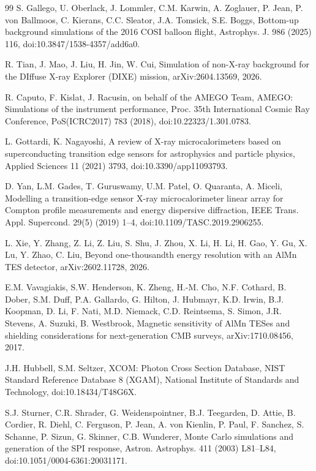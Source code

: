 \documentclass[11pt]{article}
\begin{document}
\begin{thebibliography}{99}
S. Gallego, U. Oberlack, J. Lommler, C.M. Karwin, A. Zoglauer, P. Jean, P. von Ballmoos, C. Kierans, C.C. Sleator, J.A. Tomsick, S.E. Boggs, Bottom-up background simulations of the 2016 COSI balloon flight, Astrophys. J. 986 (2025) 116, doi:10.3847/1538-4357/add6a0.

R. Tian, J. Mao, J. Liu, H. Jin, W. Cui, Simulation of non-X-ray background for the DIffuse X-ray Explorer (DIXE) mission, arXiv:2604.13569, 2026.

R. Caputo, F. Kislat, J. Racusin, on behalf of the AMEGO Team, AMEGO: Simulations of the instrument performance, Proc. 35th International Cosmic Ray Conference, PoS(ICRC2017) 783 (2018), doi:10.22323/1.301.0783.

L. Gottardi, K. Nagayoshi, A review of X-ray microcalorimeters based on superconducting transition edge sensors for astrophysics and particle physics, Applied Sciences 11 (2021) 3793, doi:10.3390/app11093793.

D. Yan, L.M. Gades, T. Guruswamy, U.M. Patel, O. Quaranta, A. Miceli, Modelling a transition-edge sensor X-ray microcalorimeter linear array for Compton profile measurements and energy dispersive diffraction, IEEE Trans. Appl. Supercond. 29(5) (2019) 1--4, doi:10.1109/TASC.2019.2906255.

L. Xie, Y. Zhang, Z. Li, Z. Liu, S. Shu, J. Zhou, X. Li, H. Li, H. Gao, Y. Gu, X. Lu, Y. Zhao, C. Liu, Beyond one-thousandth energy resolution with an AlMn TES detector, arXiv:2602.11728, 2026.

E.M. Vavagiakis, S.W. Henderson, K. Zheng, H.-M. Cho, N.F. Cothard, B. Dober, S.M. Duff, P.A. Gallardo, G. Hilton, J. Hubmayr, K.D. Irwin, B.J. Koopman, D. Li, F. Nati, M.D. Niemack, C.D. Reintsema, S. Simon, J.R. Stevens, A. Suzuki, B. Westbrook, Magnetic sensitivity of AlMn TESes and shielding considerations for next-generation CMB surveys, arXiv:1710.08456, 2017.

J.H. Hubbell, S.M. Seltzer, XCOM: Photon Cross Section Database, NIST Standard Reference Database 8 (XGAM), National Institute of Standards and Technology, doi:10.18434/T48G6X.

S.J. Sturner, C.R. Shrader, G. Weidenspointner, B.J. Teegarden, D. Attie, B. Cordier, R. Diehl, C. Ferguson, P. Jean, A. von Kienlin, P. Paul, F. Sanchez, S. Schanne, P. Sizun, G. Skinner, C.B. Wunderer, Monte Carlo simulations and generation of the SPI response, Astron. Astrophys. 411 (2003) L81--L84, doi:10.1051/0004-6361:20031171.


\end{thebibliography}
\end{document}
